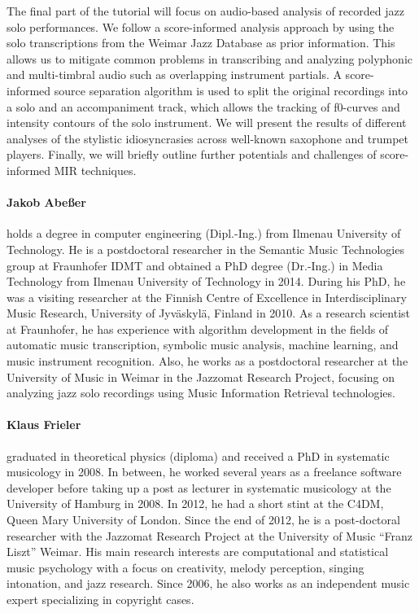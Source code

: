 {The final part of the tutorial will focus on audio-based analysis of recorded jazz solo performances. We follow a score-informed analysis approach by using the solo transcriptions from the Weimar Jazz Database as prior information. This allows us to mitigate common problems in transcribing and analyzing polyphonic and multi-timbral audio such as overlapping instrument partials. A score-informed source separation algorithm is used to split the original recordings into a solo and an accompaniment track, which allows the tracking of f0-curves and intensity contours of the solo instrument. We will present the results of different analyses of the stylistic idiosyncrasies across well-known saxophone and trumpet players. Finally, we will briefly outline further potentials and challenges of score-informed MIR techniques.}{\paragraph{Jakob Abeßer} holds a degree in computer engineering (Dipl.-Ing.) from Ilmenau University of Technology. He is a postdoctoral researcher in the Semantic Music Technologies group at Fraunhofer IDMT and obtained a PhD degree (Dr.-Ing.) in Media Technology from Ilmenau University of Technology in 2014. During his PhD, he was a visiting researcher at the Finnish Centre of Excellence in Interdisciplinary Music Research, University of Jyväskylä, Finland in 2010. As a research scientist at Fraunhofer, he has experience with algorithm development in the fields of automatic music transcription, symbolic music analysis, machine learning, and music instrument recognition. Also, he works as a postdoctoral researcher at the University of Music in Weimar in the Jazzomat Research Project, focusing on analyzing jazz solo recordings using Music Information Retrieval technologies.

\paragraph{Klaus Frieler} graduated in theoretical physics (diploma) and received a PhD in systematic musicology in 2008. In between, he worked several years as a freelance software developer before taking up a post as lecturer in systematic musicology at the University of Hamburg in 2008. In 2012, he had a short stint at the C4DM, Queen Mary University of London. Since the end of 2012, he is a post-doctoral researcher with the Jazzomat Research Project at the University of Music “Franz Liszt” Weimar. His main research interests are computational and statistical music psychology with a focus on creativity, melody perception, singing intonation, and jazz research. Since 2006, he also works as an independent music expert specializing in copyright cases.

}
